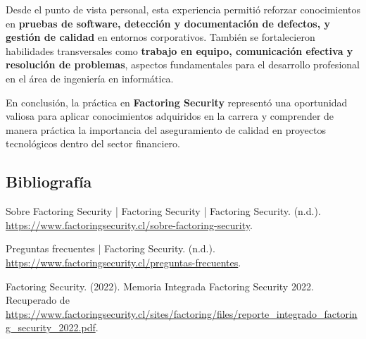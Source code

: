 \documentclass[12pt,a4paper]{report}
\begin{document}
Desde el punto de vista personal, esta experiencia permitió reforzar conocimientos en \textbf{pruebas de software, detección y documentación de defectos, y gestión de calidad} en entornos corporativos. También se fortalecieron habilidades transversales como \textbf{trabajo en equipo, comunicación efectiva y resolución de problemas}, aspectos fundamentales para el desarrollo profesional en el área de ingeniería en informática.

En conclusión, la práctica en \textbf{Factoring Security} representó una oportunidad valiosa para aplicar conocimientos adquiridos en la carrera y comprender de manera práctica la importancia del aseguramiento de calidad en proyectos tecnológicos dentro del sector financiero.
\bigskip

\subsection{Bibliografía}
Sobre Factoring Security | Factoring Security | Factoring Security. (n.d.). \url{https://www.factoringsecurity.cl/sobre-factoring-security}.

Preguntas frecuentes | Factoring Security. (n.d.). \url{https://www.factoringsecurity.cl/preguntas-frecuentes}.

Factoring Security. (2022). Memoria Integrada Factoring Security 2022. Recuperado de \url{https://www.factoringsecurity.cl/sites/factoring/files/reporte_integrado_factoring_security_2022.pdf}.

\end{document}
